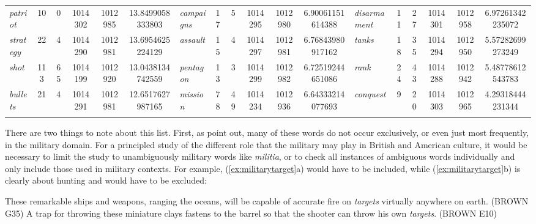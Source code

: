 \begin{table}
{\begin{tabular}{l *{2}{S[table-format=4]} *{2}{S[table-format=8]} Sl *{2}{S[table-format=4]} *{2}{S[table-format=8]} Sl *{2}{S[table-format=2]} *{2}{S[table-format=8]} S}
\textit{patriot} & 10 & 0 & 1014302 & 1012985 & 13.8499058333803 & \textit{campaigns} & 17 & 5 & 1014295 & 1012980 & 6.90061151614388 & \textit{disarmament} & 11 & 27 & 1014301 & 1012958 & 6.97261342235072 \\
\textit{strategy} & 22 & 4 & 1014290 & 1012981 & 13.6954625224129 & \textit{assault} & 15 & 4 & 1014297 & 1012981 & 6.76843980917162 & \textit{tanks} & 18 & 35 & 1014294 & 1012950 & 5.57282699273249 \\
\textit{shot} & 113 & 65 & 1014199 & 1012920 & 13.0438134742559 & \textit{pentagon} & 13 & 3 & 1014299 & 1012982 & 6.72519244651086 & \textit{rank} & 24 & 43 & 1014288 & 1012942 & 5.48778612543783 \\
\textit{bullets} & 21 & 4 & 1014291 & 1012981 & 12.6517627987165 & \textit{mission} & 78 & 49 & 1014234 & 1012936 & 6.64333214077693 & \textit{conquest} & 9 & 20 & 1014303 & 1012965 & 4.29318444231344\\
\lspbottomrule
{} \\ %
\end{tabular}}
\end{table}

There are two things to note about this list. First, as \citet{leech_computer_1992} point out, many of these words do not occur exclusively, or even just most frequently, in the military domain. For a principled study of the different role that the military may play in British  and American  culture,  it would be necessary to limit the study to unambiguously military words like \textit{militia}, or to check all instances of ambiguous  words individually and only include those used in military contexts. For example, (\ref{ex:militarytarget}a) would have to be included, while (\ref{ex:militarytarget}b) is clearly about hunting and would have to be excluded:

\begin{exe}
\ex
\begin{xlist}
\label{ex:militarytarget}
\ex These remarkable ships and weapons, ranging the oceans, will be capable of accurate fire on \textit{targets} virtually anywhere on earth. (BROWN G35)
\ex A trap for throwing these miniature clays fastens to the barrel so that the shooter can throw his own \textit{targets}. (BROWN E10)
\end{xlist}
\end{exe}


